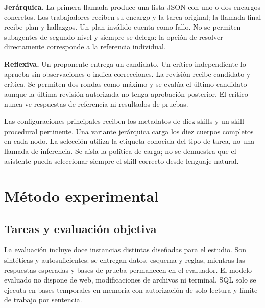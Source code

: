 \textbf{Jerárquica.} La primera llamada produce una lista JSON con uno o dos encargos concretos. Los trabajadores reciben su encargo y la tarea original; la llamada final recibe plan y hallazgos. Un plan inválido cuenta como fallo. No se permiten subagentes de segundo nivel y siempre se delega: la opción de resolver directamente corresponde a la referencia individual.

\textbf{Reflexiva.} Un proponente entrega un candidato. Un crítico independiente lo aprueba sin observaciones o indica correcciones. La revisión recibe candidato y crítica. Se permiten dos rondas como máximo y se evalúa el último candidato aunque la última revisión autorizada no tenga aprobación posterior. El crítico nunca ve respuestas de referencia ni resultados de pruebas.

Las configuraciones principales reciben los metadatos de diez skills y un skill procedural pertinente. Una variante jerárquica carga los diez cuerpos completos en cada nodo. La selección utiliza la etiqueta conocida del tipo de tarea, no una llamada de inferencia. Se aísla la política de carga; no se demuestra que el asistente pueda seleccionar siempre el skill correcto desde lenguaje natural.

\section{Método experimental}
\subsection{Tareas y evaluación objetiva}
La evaluación incluye doce instancias distintas diseñadas para el estudio. Son sintéticas y autosuficientes: se entregan datos, esquema y reglas, mientras las respuestas esperadas y bases de prueba permanecen en el evaluador. El modelo evaluado no dispone de web, modificaciones de archivos ni terminal. SQL solo se ejecuta en bases temporales en memoria con autorización de solo lectura y límite de trabajo por sentencia.

